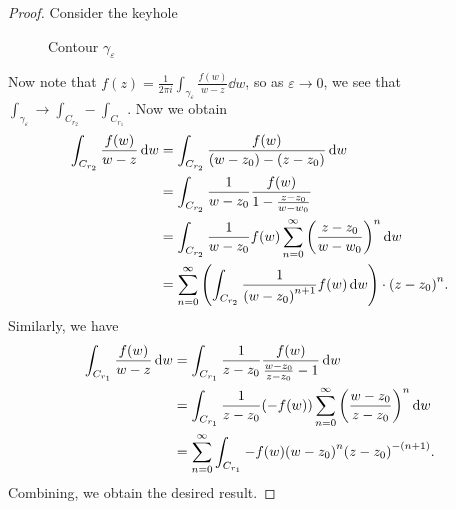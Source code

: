 \documentclass[leqno, openany]{memoir}
\theoremstyle{definition}
\theoremstyle{remark}
\theoremstyle{plain}
\theoremstyle{definition}
\theoremstyle{remark}
\newcommand{\ep}{\varepsilon}
\begin{document}
\begin{proof}
    Consider the keyhole
    \begin{figure}[H]
    \begin{center}
    \end{center}
    \caption{Contour $\gamma_{\ep}$}%
    \label{fig:contour-5}
    \end{figure}
    Now note that $f(z) = \frac{1}{2 \pi i} \int_{\gamma_{\ep}} \frac{f(w)}{w-z} \dd{w}$, so as $\ep \to 0$, we see that $\int_{\gamma_{\ep}} \to \int_{C_{r_2}} - \int_{C_{r_1}}$. Now we obtain
    \begin{align*}
        \int_{C_{r_2}} \frac{f(w)}{w-z} \dd{w} &= \int_{C_{r_2}} \frac{f(w)}{(w-z_0) - (z-z_0)} \dd{w} \\
                                               &= \int_{C_{r_2}} \frac{1}{w-z_0} \frac{f(w)}{1 - \frac{z-z_0}{w-w_0}} \\
                                               &= \int_{C_{r_2}} \frac{1}{w-z_0} f(w) \sum_{n=0}^{\infty} {\qty(\frac{z-z_0}{w-w_0})}^n \dd{w} \\
                                               &= \sum_{n=0}^{\infty} \qty(\int_{C_{r_2}} \frac{1}{{(w-z_0)}^{n+1}} f(w) \dd{w}) \cdot {(z-z_0)}^n.
    \end{align*}
    Similarly, we have 
    \begin{align*}
        \int_{C_{r_1}} \frac{f(w)}{w-z} \dd{w} &= \int_{C_{r_1}} \frac{1}{z-z_0} \frac{f(w)}{\frac{w-z_0}{z-z_0}-1} \dd{w} \\
                                               &= \int_{C_{r_1}} \frac{1}{z-z_0} (-f(w)) \sum_{n=0}^{\infty} {\qty(\frac{w-z_0}{z-z_0})}^n \dd{w} \\
                                               &= \sum_{n=0}^{\infty} \int_{C_{r_1}} -f(w) {(w-z_0)}^n {(z-z_0)}^{-(n+1)}.
    \end{align*}
    Combining, we obtain the desired result.
\end{proof}
\end{document}
